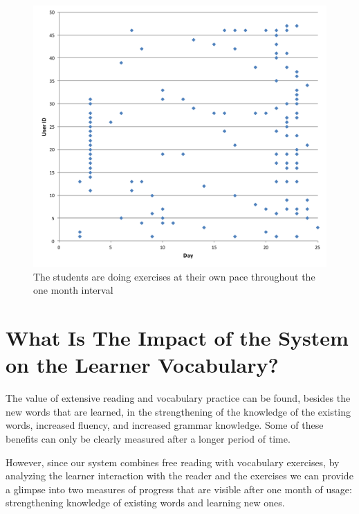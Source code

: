   \begin{figure}[h!]
  \centering
    \includegraphics[width=0.8\columnwidth]{figures/user_exercise_activity_vs_day.pdf}
    \caption{The students are doing exercises at their own pace throughout the one month interval }
    \label{fig:activity_per_day}
  \end{figure}






\newpage
\section{What Is The Impact of the System on the Learner Vocabulary?}

  The value of extensive reading and vocabulary practice can be found, besides the new words that are learned, in the strengthening of the knowledge of the existing words, increased fluency, and increased grammar knowledge. Some of these benefits can only be clearly measured after a longer period of time\cite{renadya07-power}. 

  However, since our system combines free reading with vocabulary exercises, by analyzing the learner interaction with the reader and the exercises we can provide a glimpse into two measures of progress that are visible after one month of usage: strengthening knowledge of existing words and learning new ones. 

